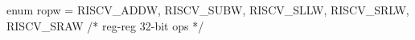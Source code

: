 enum ropw  = {RISCV_ADDW, RISCV_SUBW, RISCV_SLLW,
              RISCV_SRLW, RISCV_SRAW}             /* reg-reg 32-bit ops */
